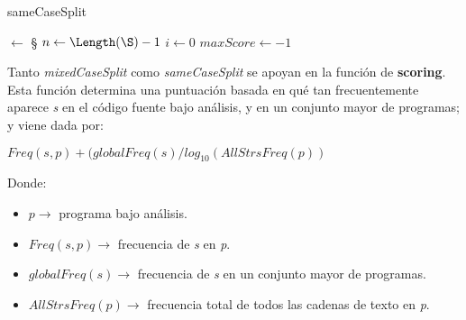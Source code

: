 \begin{algorithm}[H]
\caption{sameCaseSplit}
\label{sameCaseSplit}
\DontPrintSemicolon
  

  
  \BlankLine
  \SplitToken $\gets$ \S\;
  $n \gets \Length(\S) - 1$\;
  $i \gets 0$\;
  $maxScore \gets -1$\;
  
  \BlankLine
  
\end{algorithm}

Tanto \textit{mixedCaseSplit} como \textit{sameCaseSplit} se apoyan en la función de \textbf{scoring}.
Esta función determina una puntuación basada en qué tan frecuentemente aparece \textit{s} en el código fuente bajo análisis, y en un conjunto mayor de programas; y viene dada por:
\begin{center}
$Freq(s,p) + (globalFreq(s) / log_{10} (AllStrsFreq(p))$ 
\end{center}

Donde:
\begin{itemize}  \item $p \rightarrow$ programa bajo análisis.
  \item $Freq(s,p) \rightarrow$ frecuencia de \textit{s} en \textit{p}.
  \item $globalFreq(s) \rightarrow$ frecuencia de \textit{s} en un conjunto mayor de programas.
  \item $AllStrsFreq(p) \rightarrow$ frecuencia total de todos las cadenas de texto en \textit{p}.
\end{itemize}

